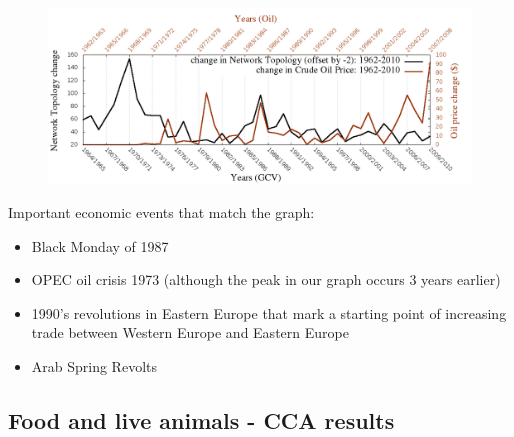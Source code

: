 \documentclass[11pt,a4paper,oneside]{report}
\begin{document}
\begin{figure}[H]
  \centering
\includegraphics[scale=0.4]
{../code/final_results/all_trade_thresh/change_over_time.png}
\caption{}
\label{fig:hsa_meta}
\end{figure}

Important economic events that match the graph:
\begin{itemize}
 \item Black Monday of 1987
 \item OPEC oil crisis 1973 (although the peak in our graph occurs 3 years earlier)
 \item 1990's revolutions in Eastern Europe that mark a starting point of 
 increasing trade between Western Europe and Eastern Europe
 \item Arab Spring Revolts
\end{itemize}


\subsection*{Food and live animals - CCA results}
\end{document}
